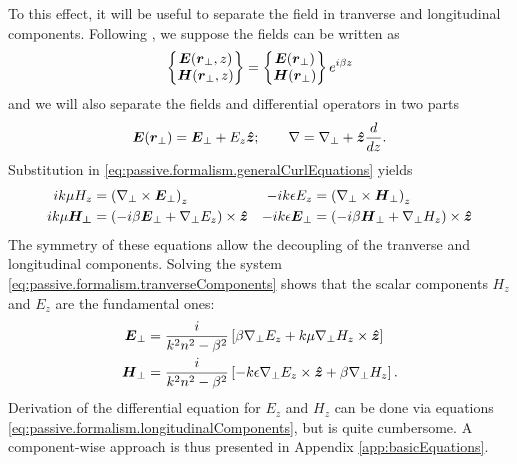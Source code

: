 To this effect, it will be useful to separate the field 
in tranverse and longitudinal components. Following \cite{JAC1962,SCH2004}, 
we suppose the fields can be written as 
  \begin{equation}
    \begin{Bmatrix}\boldsymbol{E}(\boldsymbol{r}_\perp,z)\\\boldsymbol{H}(\boldsymbol{r}_\perp,z)\end{Bmatrix} = \begin{Bmatrix}\boldsymbol{E}(\boldsymbol{r}_\perp)\\\boldsymbol{H}(\boldsymbol{r}_\perp)\end{Bmatrix}e^{i\beta z}
  \end{equation}
and we will also separate the fields and differential operators in two parts
  \begin{equation}
   \boldsymbol{E}(\boldsymbol{r}_\perp)= \boldsymbol{E}_\perp+E_z\boldsymbol{\hat{z}}; \qquad \nabla=\nabla_\perp + \boldsymbol{\hat{z}}\frac{d}{dz}.
  \end{equation}
Substitution in \eqref{eq:passive.formalism.generalCurlEquations} yields
  \begin{align}
    ik\mu H_z 		&= \left(\nabla_\perp\times\boldsymbol{E}_\perp\right)_z			& -ik\epsilon E_z 		&= \left(\nabla_\perp\times \boldsymbol{H}_\perp\right)_z	\label{eq:passive.formalism.longitudinalComponents}\\
    ik\mu\boldsymbol{H_\perp}	&= \left(-i\beta\boldsymbol{E}_\perp+\nabla_\perp E_z\right)\times\boldsymbol{\hat{z}}	& -ik\epsilon\boldsymbol{E}_\perp 	&= \left(-i\beta\boldsymbol{H}_\perp+\nabla_\perp H_z\right)\times\boldsymbol{\hat{z}} \label{eq:passive.formalism.tranverseComponents}
  \end{align}
The symmetry of these equations allow the decoupling of the tranverse and longitudinal components. 
Solving the system \eqref{eq:passive.formalism.tranverseComponents} 
shows that the scalar components $H_z$ and $E_z$ are the fundamental ones:
  \begin{subequations}
  \begin{align}
    \boldsymbol{E}_\perp	&= \frac{i}{k^2n^2-\beta^2}\left[\beta\nabla_\perp E_z+k\mu\nabla_\perp H_z\times\boldsymbol{\hat{z}}\right]	\\
    \boldsymbol{H}_\perp	&= \frac{i}{k^2n^2-\beta^2}\left[-k\epsilon\nabla_\perp E_z\times\boldsymbol{\hat{z}}+\beta\nabla_\perp H_z\right].
  \end{align}
  \end{subequations}
Derivation of the differential equation for $E_z$ and $H_z$ can be
done via equations \eqref{eq:passive.formalism.longitudinalComponents}, but
is quite cumbersome. A component-wise approach is thus presented in Appendix \ref{app:basicEquations}. 

